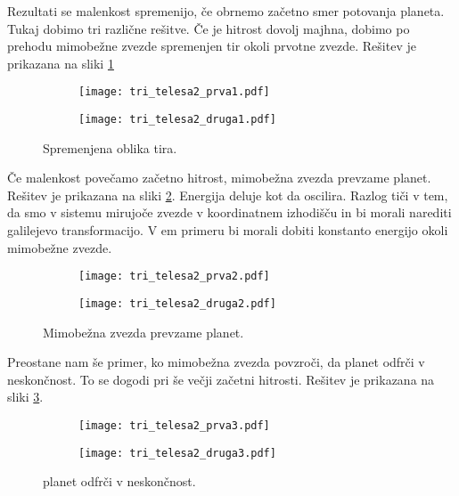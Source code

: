 \documentclass[12pt,a4paper]{article}
\begin{document}
Rezultati se malenkost spremenijo, če obrnemo začetno smer potovanja planeta. Tukaj dobimo tri različne rešitve. Če je hitrost dovolj majhna, dobimo po prehodu mimobežne zvezde spremenjen tir okoli prvotne zvezde. Rešitev je prikazana na sliki \ref{fig:slika10}
\begin{figure}[H]
    \centering
    \begin{subfigure}[b]{0.45\textwidth}  			
        \texttt{[image: tri\_telesa2\_prva1.pdf]}
    \end{subfigure}
    \begin{subfigure}[b]{0.45\textwidth}  			
        \texttt{[image: tri\_telesa2\_druga1.pdf]}
    \end{subfigure}
    \caption{Spremenjena oblika tira.} \label{fig:slika10}
\end{figure}
\noindent Če malenkost povečamo začetno hitrost, mimobežna zvezda prevzame planet. Rešitev je prikazana na sliki \ref{fig:slika11}. Energija deluje kot da oscilira. Razlog tiči v tem, da smo v sistemu mirujoče zvezde v koordinatnem izhodišču in bi morali narediti galilejevo transformacijo. V em primeru bi morali dobiti konstanto energijo okoli mimobežne zvezde.
\begin{figure}[H]
    \centering
    \begin{subfigure}[b]{0.45\textwidth}  			
        \texttt{[image: tri\_telesa2\_prva2.pdf]}
    \end{subfigure}
    \begin{subfigure}[b]{0.45\textwidth}  			
        \texttt{[image: tri\_telesa2\_druga2.pdf]}
    \end{subfigure}
    \caption{Mimobežna zvezda prevzame planet.} \label{fig:slika11}
\end{figure}
\noindent Preostane nam še primer, ko mimobežna zvezda povzroči, da planet odfrči v neskončnost. To se dogodi pri še večji začetni hitrosti. Rešitev je prikazana na sliki \ref{fig:slika12}.

\begin{figure}[H]
    \centering
    \begin{subfigure}[b]{0.45\textwidth}  			
        \texttt{[image: tri\_telesa2\_prva3.pdf]}
    \end{subfigure}
    \begin{subfigure}[b]{0.45\textwidth}  			
        \texttt{[image: tri\_telesa2\_druga3.pdf]}
    \end{subfigure}
    \caption{planet odfrči v neskončnost.} \label{fig:slika12}
\end{figure}
\end{document}
